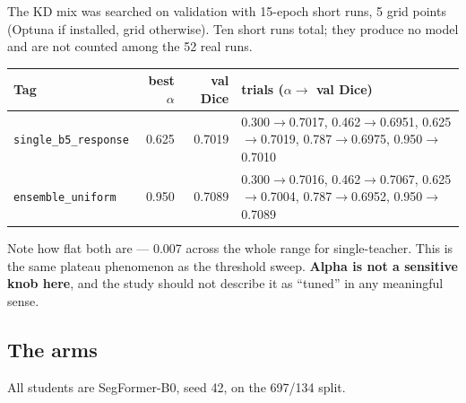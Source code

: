 \documentclass[11pt]{article}
\begin{document}
The KD mix was searched on validation with 15-epoch short runs, 5 grid points
(Optuna if installed, grid otherwise). Ten short runs total; they produce no
model and are not counted among the 52 real runs.

\begin{center}
\begin{tabular}{lnnW}
\toprule
\textbf{Tag} & \textbf{best $\alpha$} & \textbf{val Dice} & \textbf{trials ($\alpha\to$ val Dice)} \\
\midrule
\texttt{single\_b5\_response} & 0.625 & 0.7019 & 0.300$\to$0.7017, 0.462$\to$0.6951, 0.625$\to$0.7019, 0.787$\to$0.6975, 0.950$\to$0.7010 \\
\texttt{ensemble\_uniform} & 0.950 & 0.7089 & 0.300$\to$0.7016, 0.462$\to$0.7067, 0.625$\to$0.7004, 0.787$\to$0.6952, 0.950$\to$0.7089 \\
\bottomrule
\end{tabular}
\end{center}

Note how flat both are --- 0.007 across the whole range for single-teacher. This
is the same plateau phenomenon as the threshold sweep. \textbf{Alpha is not a
sensitive knob here}, and the study should not describe it as ``tuned'' in any
meaningful sense.

\subsection{The arms}

All students are SegFormer-B0, seed 42, on the 697/134 split.
\end{document}
